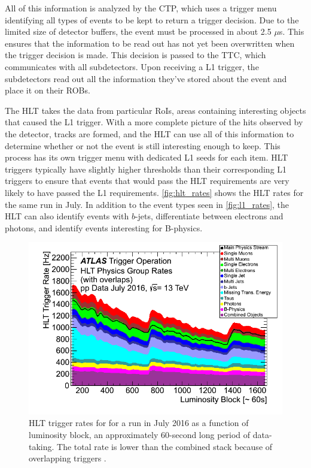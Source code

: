 
All of this information is analyzed by the \ac{CTP}, which uses a trigger menu identifying all types of events to be kept to return a trigger decision. Due to the limited size of detector buffers, the event must be processed in about 2.5 $\mu$s. This ensures that the information to be read out has not yet been overwritten when the trigger decision is made. This decision is passed to the \ac{TTC}, which communicates with all subdetectors. Upon receiving a \ac{L1} trigger, the subdetectors read out all the information they've stored about the event and place it on their \acp{ROB}.

The \ac{HLT} takes the data from particular \acp{RoI}, areas containing interesting objects that caused the \ac{L1} trigger. With a more complete picture of the hits observed by the detector, tracks are formed, and the \ac{HLT} can use all of this information to determine whether or not the event is still interesting enough to keep. This process has its own trigger menu with dedicated \ac{L1} seeds for each item. \ac{HLT} triggers typically have slightly higher thresholds than their corresponding \ac{L1} triggers to ensure that events that would pass the \ac{HLT} requirements are very likely to have passed the \ac{L1} requirements. \autoref{fig:hlt_rates} shows the \ac{HLT} rates for the same run in July. In addition to the event types seen in \autoref{fig:l1_rates}, the \ac{HLT} can also identify events with $b$-jets, differentiate between electrons and photons, and identify events interesting for B-physics. 

\begin{centering}
\begin{figure}[!hbt]
\myfloatalign
\includegraphics[width=.90\linewidth]{figures/atlas/Time_HLTGroupRate_Stack_2016_07.png}
\caption{\ac{HLT} trigger rates for for a run in July 2016 as a function of luminosity block, an approximately 60-second long period of data-taking. The total rate is lower than the combined stack because of overlapping triggers \cite{trigger}.}
\label{fig:hlt_rates}
\end{figure}
\end{centering}


